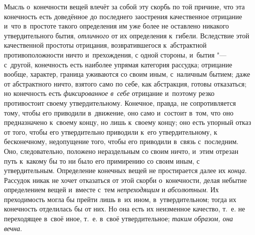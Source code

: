 Мысль о~конечности вещей влечёт за собой эту скорбь по той причине, что эта
конечность есть доведённое до последнего заострения качественное отрицание
и~что в~простоте такого определения им уже более не оставлено никакого
утвердительного бытия, {\em отличного} от их
определения к~гибели. Вследствие этой качественной простоты отрицания,
возвратившегося к~абстрактной противоположности ничто и~прехождения, с
одной стороны, и~бытия "--- с~другой, конечность есть наиболее упрямая
категория рассудка; отрицание вообще, характер, граница уживаются со своим
иным, с~наличным бытием; даже от абстрактного ничто, взятого само по
себе, как абстракция, готовы отказаться; но конечность есть
{\em фиксированное в~себе} отрицание и~поэтому резко
противостоит своему утвердительному. Конечное, правда, не сопротивляется
тому, чтобы его приводили в~движение, оно само и~состоит в~том, что оно
предназначено к~своему концу, но лишь к~своему концу; оно есть упорный
отказ от того, чтобы его утвердительно приводили к~его утвердительному, к
бесконечному, недопущение того, чтобы его приводили в~связь с~последним.
Оно, следовательно, положено нераздельным со своим ничто, и~этим отрезан
путь к~какому бы то ни было его примирению со своим иным, с
утвердительным. Определение конечных вещей не простирается далее их
{\em конца}. Рассудок никак не хочет отказаться от этой
скорби о~конечности, делая небытие определением вещей и~вместе с~тем
{\em непреходящим} и
{\em абсолютным}. Их преходимость могла бы прейти лишь
в~их ином, в~утвердительном; тогда их конечность отделилась бы от них. Но
она есть их неизменное качество, т.~е. не переходящее в~своё иное, т.~е.
в~своё утвердительное; {\em таким образом, она вечна}.

